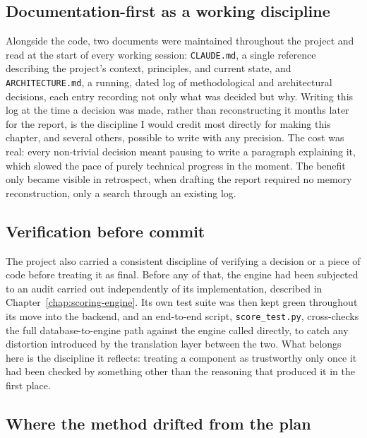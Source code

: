 \subsection{Documentation-first as a working discipline}
\label{sec:pm-documentation-first}

Alongside the code, two documents were maintained throughout the project and read at the start of every working session: \texttt{CLAUDE.md}, a single reference describing the project's context, principles, and current state, and \texttt{ARCHITECTURE.md}, a running, dated log of methodological and architectural decisions, each entry recording not only what was decided but why. Writing this log at the time a decision was made, rather than reconstructing it months later for the report, is the discipline I would credit most directly for making this chapter, and several others, possible to write with any precision. The cost was real: every non-trivial decision meant pausing to write a paragraph explaining it, which slowed the pace of purely technical progress in the moment. The benefit only became visible in retrospect, when drafting the report required no memory reconstruction, only a search through an existing log.

\subsection{Verification before commit}
\label{sec:pm-verification}

The project also carried a consistent discipline of verifying a decision or a piece of code before treating it as final. Before any of that, the engine had been subjected to an audit carried out independently of its implementation, described in Chapter~\ref{chap:scoring-engine}. Its own test suite was then kept green throughout its move into the backend, and an end-to-end script, \texttt{score\_test.py}, cross-checks the full database-to-engine path against the engine called directly, to catch any distortion introduced by the translation layer between the two. What belongs here is the discipline it reflects: treating a component as trustworthy only once it had been checked by something other than the reasoning that produced it in the first place.

\subsection{Where the method drifted from the plan}
\label{sec:pm-plan-drift}

